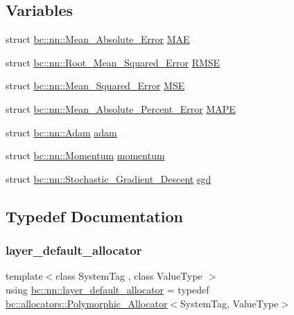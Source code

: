 \subsection*{Variables}
\begin{DoxyCompactItemize}
\item 
struct \hyperlink{structbc_1_1nn_1_1Mean__Absolute__Error}{bc\+::nn\+::\+Mean\+\_\+\+Absolute\+\_\+\+Error} \hyperlink{namespacebc_1_1nn_a750f7a0e2cf0394b33d96d0ed4215324}{M\+AE}
\item 
struct \hyperlink{structbc_1_1nn_1_1Root__Mean__Squared__Error}{bc\+::nn\+::\+Root\+\_\+\+Mean\+\_\+\+Squared\+\_\+\+Error} \hyperlink{namespacebc_1_1nn_ab1183e69180fb5a708babd6a2b1108b9}{R\+M\+SE}
\item 
struct \hyperlink{structbc_1_1nn_1_1Mean__Squared__Error}{bc\+::nn\+::\+Mean\+\_\+\+Squared\+\_\+\+Error} \hyperlink{namespacebc_1_1nn_a68f287847db51c1b954a80b67254ea30}{M\+SE}
\item 
struct \hyperlink{structbc_1_1nn_1_1Mean__Absolute__Percent__Error}{bc\+::nn\+::\+Mean\+\_\+\+Absolute\+\_\+\+Percent\+\_\+\+Error} \hyperlink{namespacebc_1_1nn_a79e2cb825afd655959942b256380f212}{M\+A\+PE}
\item 
struct \hyperlink{structbc_1_1nn_1_1Adam}{bc\+::nn\+::\+Adam} \hyperlink{namespacebc_1_1nn_a8c31de21c1ca1a76f7888b8eecce7774}{adam}
\item 
struct \hyperlink{structbc_1_1nn_1_1Momentum}{bc\+::nn\+::\+Momentum} \hyperlink{namespacebc_1_1nn_a103e3ff34c6a6b393908837f39947b73}{momentum}
\item 
struct \hyperlink{structbc_1_1nn_1_1Stochastic__Gradient__Descent}{bc\+::nn\+::\+Stochastic\+\_\+\+Gradient\+\_\+\+Descent} \hyperlink{namespacebc_1_1nn_a4b614663e3ff7f18425e5dc00ebbb67c}{sgd}
\end{DoxyCompactItemize}


\subsection{Typedef Documentation}
\mbox{\label{namespacebc_1_1nn_ada5847e5a4ac1bbdcc0b8dbcfcbf320e}} 
\subsubsection{\texorpdfstring{layer\+\_\+default\+\_\+allocator}{layer\_default\_allocator}}
{\footnotesize\ttfamily template$<$class System\+Tag , class Value\+Type $>$ \\
using \hyperlink{namespacebc_1_1nn_ada5847e5a4ac1bbdcc0b8dbcfcbf320e}{bc\+::nn\+::layer\+\_\+default\+\_\+allocator} = typedef \hyperlink{structbc_1_1allocators_1_1Polymorphic__Allocator}{bc\+::allocators\+::\+Polymorphic\+\_\+\+Allocator}$<$System\+Tag, Value\+Type$>$}

